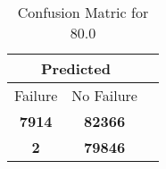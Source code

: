 \begin{table}[] 
\caption{Confusion Matric for 80.0} 
\label{Table: Prediction Accuracy-DMD80.0OnlySunEKF-ignoreReflection100.9EKF-top2-Reflection} 
\centering 
\begin{tabular} 
 {@{}ccc@{}} 
\toprule 
\multicolumn{2}{c}{\textbf{Predicted}}
 \\ \midrule 
\multicolumn{1}{|c|}{Failure} & 
\multicolumn{1}{c|}{No Failure}
 \\ \midrule 
\multicolumn{1}{|c|}{\color{green}\textbf{7914}} & 
\multicolumn{1}{c|}{\color{green}\textbf{82366}}
 \\ \midrule 
\multicolumn{1}{|c|}{\color{red}\textbf{2}} & 
\multicolumn{1}{c|}{\color{red}\textbf{79846}}
 \\ \bottomrule 
\end{tabular} 
\end{table} 
